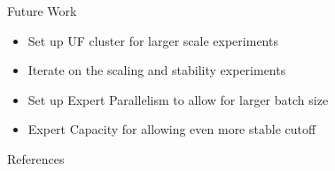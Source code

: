 \documentclass{beamer}
\begin{document}
\begin{frame}{Future Work}
\begin{center}
    \begin{itemize}
        \item Set up UF cluster for larger scale experiments
        \item Iterate on the scaling and stability experiments
        \item Set up Expert Parallelism to allow for larger batch size
        \item Expert Capacity for allowing even more stable cutoff
    \end{itemize}
\end{center}
\end{frame}

\begin{frame}[allowframebreaks]{References}


\end{frame}
\end{document}
